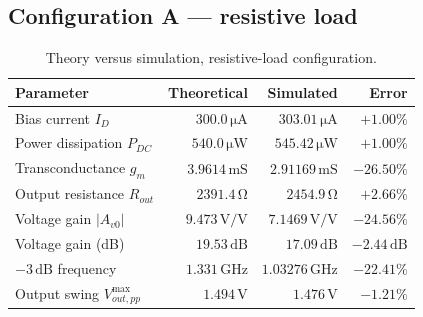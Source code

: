\documentclass[12pt,a4paper]{article}
\newcommand{\U}[1]{\,\mathrm{#1}}
\begin{document}
\subsection{Configuration A --- resistive load}
\begin{table}[H]
\centering
\caption{Theory versus simulation, resistive-load configuration.}
\label{tab:tvsA}
\begin{tabular}{lrrr}
\toprule
\textbf{Parameter} & \textbf{Theoretical} & \textbf{Simulated} & \textbf{Error} \\
\midrule
Bias current $I_D$            & $300.0\U{\mu A}$   & $303.01\U{\mu A}$  & $+1.00\%$ \\
Power dissipation $P_{DC}$    & $540.0\U{\mu W}$   & $545.42\U{\mu W}$  & $+1.00\%$ \\
Transconductance $g_m$        & $3.9614\U{mS}$     & $2.91169\U{mS}$    & $-26.50\%$ \\
Output resistance $R_{out}$   & $2391.4\U{\Omega}$ & $2454.9\U{\Omega}$ & $+2.66\%$ \\
Voltage gain $|A_{v0}|$       & $9.473\U{V/V}$     & $7.1469\U{V/V}$    & $-24.56\%$ \\
Voltage gain (dB)             & $19.53\U{dB}$      & $17.09\U{dB}$      & $-2.44\U{dB}$ \\
$-3\U{dB}$ frequency          & $1.331\U{GHz}$     & $1.03276\U{GHz}$   & $-22.41\%$ \\
Output swing $V_{out,pp}^{\max}$ & $1.494\U{V}$    & $1.476\U{V}$       & $-1.21\%$ \\
\bottomrule
\end{tabular}
\end{table}
\end{document}
